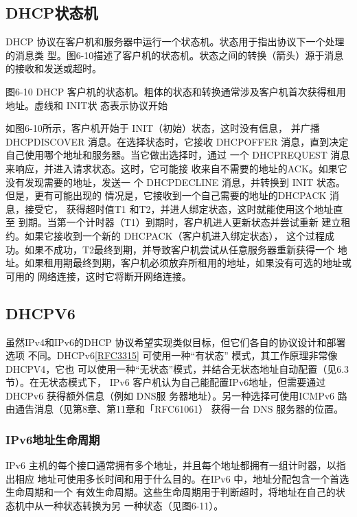 \subsection{DHCP状态机}

DHCP 协议在客户机和服务器中运行一个状态机。状态用于指出协议下一个处理的消息类
型。图6-10描述了客户机的状态机。状态之间的转换（箭头）源于消息的接收和发送或超时。

图6-10 DHCP 客户机的状态机。粗体的状态和转换通常涉及客户机首次获得租用地址。虚线和 INIT状
态表示协议开始

如图6-10所示，客户机开始于 INIT（初始）状态，这时没有信息，
并广播 DHCPDISCOVER 消息。在选择状态时，它接收 DHCPOFFER
消息，直到决定自己使用哪个地址和服务器。当它做出选择时，通过
一个 DHCPREQUEST 消息来响应，并进入请求状态。这时，它可能接
收来自不需要的地址的ACK。如果它没有发现需要的地址，发送一
个 DHCPDECLINE 消息，并转换到 INIT 状态。但是，更有可能出现的
情况是，它接收到一个自己需要的地址的DHCPACK 消息，接受它，
获得超时值T1 和T2，并进人绑定状态，这时就能使用这个地址直至
到期。当第一个计时器（T1）到期时，客户机进人更新状态并尝试重新
建立租约。如果它接收到一个新的 DHCPACK（客户机进入绑定状态），
这个过程成功。如果不成功，T2最终到期，并导致客户机尝试从任意服务器重新获得一个
地址。如果租用期最终到期，客户机必须放弃所租用的地址，如果没有可选的地址或可用的
网络连接，这时它将断开网络连接。

\subsection{DHCPV6}
虽然IPv4和IPv6的DHCP 协议希望实现类似目标，但它们各自的协议设计和部署选项
不同。DHCPv6\href{https://www.rfc-editor.org/rfc/rfc3315}{\href{https://www.rfc-editor.org/rfc/rfc3315}{[RFC3315]}} 可使用一种“有状态” 模式，其工作原理非常像DHCPV4，它也
可以使用一种“无状态”模式，并结合无状态地址自动配置（见6.3节）。在无状态模式下，
IPv6 客户机认为自己能配置IPv6地址，但需要通过DHCPv6 获得额外信息（例如 DNS服
务器地址）。另一种选择可使用ICMPv6 路由通告消息（见第8章、第11章和「RFC61061）
获得一台 DNS 服务器的位置。

\subsubsection{IPv6地址生命周期}

IPv6 主机的每个接口通常拥有多个地址，并且每个地址都拥有一组计时器，以指出相应
地址可使用多长时间和用于什么目的。在IPv6 中，地址分配包含一个首选生命周期和一个
有效生命周期。这些生命周期用于判断超时，将地址在自己的状态机中从一种状态转换为另
一种状态（见图6-11）。

